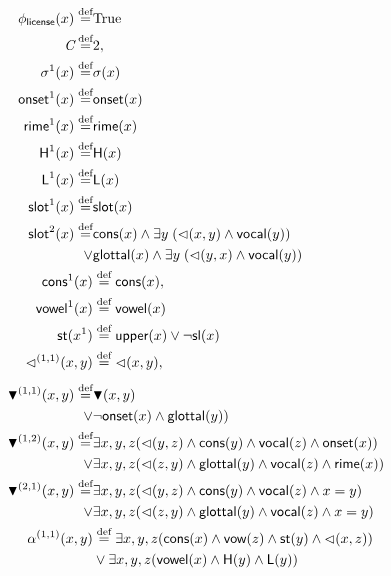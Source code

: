 \documentclass[11pt]{article}
\begin{document}
\begin{align*}
	\phi_{\textsf{license}}(x) \stackrel{\text{def}}{=}& \text{True}\\
	\textit{C} \stackrel{\text{def}}{=}& 2, \\
	\sigma^1(x) \stackrel{\text{def}}{=}& \sigma(x)\\
	\textsf{onset}^1 (x)\stackrel{\text{def}}{=}& \textsf{onset} (x) \\
	\textsf{rime}^1 (x) \stackrel{\text{def}}{=}& \textsf{rime} (x) \\
	\textsf{H}^1 (x) \stackrel{\text{def}}{=}& \textsf{H} (x) \\
	\textsf{L}^1 (x) \stackrel{\text{def}}{=}& \textsf{L} (x) \\
	\textsf{slot}^1 (x) \stackrel{\text{def}}{=}& \textsf{slot} (x)\\
	\textsf{slot}^2 (x) \stackrel{\text{def}}{=} & \textsf{cons}(x) \wedge\exists y\;(\lhd(x,y) \wedge \textsf{vocal}(y))\\
						\vee & \textsf{glottal}(x) \wedge\exists y\;(\lhd(y,x) \wedge \textsf{vocal}(y))\\
	\textsf{cons}^1 (x) & \stackrel{\text{def}}{=} \textsf{cons} (x), \\
	\textsf{vowel}^1 (x) & \stackrel{\text{def}}{=} \textsf{vowel} (x) \\
	\textsf{st}(x^1) & \stackrel{\text{def}}{=} \textsf{upper}(x) \vee \lnot \textsf{sl}(x) \\
	\lhd^{(1,1)}(x,y) &\stackrel{\text{def}}{=} \lhd(x,y), \\[4pt]
	\blacktriangledown^{(1,1)}(x,y) \stackrel{\text{def}}{=} & \blacktriangledown(x,y) \\
									\vee  & \lnot \textsf{onset}(x) \wedge \textsf{glottal}(y))\\
	\blacktriangledown^{(1,2)}(x,y) \stackrel{\text{def}}{=} & \exists x,y,z (\lhd(y,z) \wedge \textsf{cons}(y) \wedge \textsf{vocal}(z) \wedge \textsf{onset}(x))\\
	\vee &\exists x,y,z (\lhd(z,y) \wedge \textsf{glottal}(y) \wedge \textsf{vocal}(z) \wedge \textsf{rime}(x))\\
	\blacktriangledown^{(2,1)}(x,y) \stackrel{\text{def}}{=} & \exists x,y,z (\lhd(y,z) \wedge \textsf{cons}(y) \wedge \textsf{vocal}(z) \wedge x = y)\\
	\vee &\exists x,y,z (\lhd(z,y) \wedge \textsf{glottal}(y) \wedge \textsf{vocal}(z) \wedge x = y)\\
	\alpha^{(1,1)}(x,y) &\stackrel{\text{def}}{=}
	\exists x,y,z (
	\textsf{cons}(x)
	\wedge
	\textsf{vow}(z)
	\wedge
	\textsf{st}(y)
	\wedge
	\lhd(x,z)
	) \\
	&\vee
	\exists x,y,z (
	\textsf{vowel}(x)
	\wedge
	\textsf{H}(y)
	\wedge
	\textsf{L}(y)
	)
\end{align*}




\end{document}
